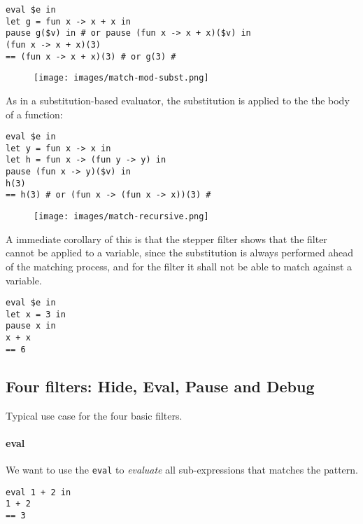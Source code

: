 \begin{verbatim}
eval $e in
let g = fun x -> x + x in
pause g($v) in # or pause (fun x -> x + x)($v) in
(fun x -> x + x)(3)
== (fun x -> x + x)(3) # or g(3) #
\end{verbatim}

\begin{figure}[h]
  \texttt{[image: images/match-mod-subst.png]}
\end{figure}

As in a substitution-based evaluator, the substitution is applied to the
the body of a function:
\begin{verbatim}
eval $e in
let y = fun x -> x in
let h = fun x -> (fun y -> y) in
pause (fun x -> y)($v) in
h(3)
== h(3) # or (fun x -> (fun x -> x))(3) #
\end{verbatim}

\begin{figure}[h]
  \texttt{[image: images/match-recursive.png]}
\end{figure}

A immediate corollary of this is that the stepper filter shows that
the filter cannot be applied to a variable, since the substitution is always
performed ahead of the matching process, and for the filter it shall not be
able to match against a variable.

\begin{verbatim}
eval $e in
let x = 3 in
pause x in
x + x
== 6
\end{verbatim}


\subsection{Four filters: Hide, Eval, Pause and Debug}


Typical use case for the four basic filters.

\paragraph{eval} We want to use the \verb|eval| to \emph{evaluate} all sub-expressions that matches the pattern.
\begin{verbatim}
eval 1 + 2 in
1 + 2
== 3
\end{verbatim}

